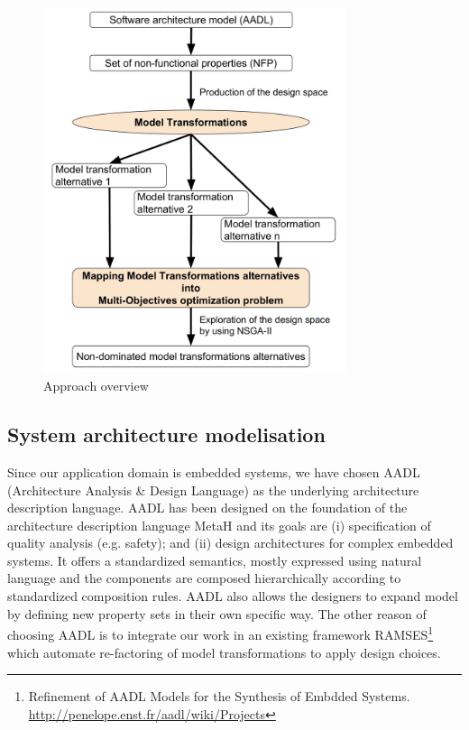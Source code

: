 \documentclass[conference]{IEEEtran}
\begin{document}
\begin{figure}[!ht]
\centering
\includegraphics[width=3.49in]{IDMT.pdf}
\caption{Approach overview}
\label{IS}
\end{figure}

\subsection{System architecture modelisation}
Since our application domain is embedded systems, we have chosen AADL (Architecture Analysis \& Design Language) as the underlying architecture description language. AADL has been designed on the foundation of the architecture description language MetaH and its goals are (i) specification of quality analysis (e.g. safety); and (ii) design architectures for complex embedded systems. It offers a standardized semantics, mostly expressed using natural language and the components are composed hierarchically according to standardized composition rules. AADL also allows the designers to expand model by defining new property sets in their own specific way. The other reason of choosing AADL is to integrate our work in an existing framework RAMSES\footnote{Refinement of AADL Models for the Synthesis of Embdded Systems. \url{http://penelope.enst.fr/aadl/wiki/Projects}} which automate re-factoring of model transformations to apply design choices\cite{greg}.
\end{document}
